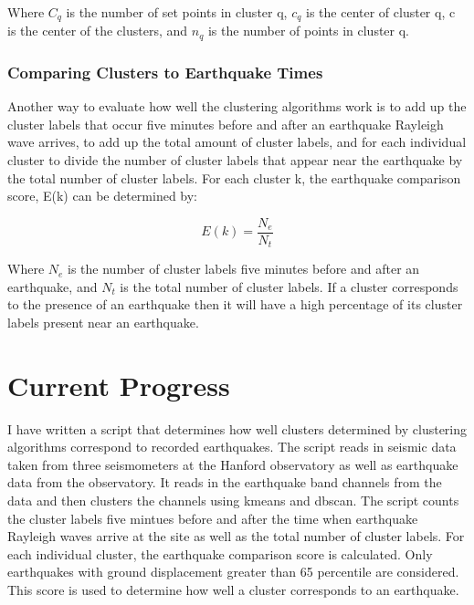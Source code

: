 \documentclass[colorlinks=true,pdfstartview=FitV,linkcolor=blue,
            citecolor=red,urlcolor=magenta]{ligodoc}
\begin{document}
\par Where \(C_q\) is the number of set points in cluster q, \(c_q\) is the center of cluster q, c is the center of the clusters, and \(n_q\) is the number of points in cluster q. \cite{Citation2} 

\subsubsection{Comparing Clusters to Earthquake Times}

\indent 

\par Another way to evaluate how well the clustering algorithms work is to add up the cluster labels that occur five  minutes before and after an earthquake Rayleigh wave arrives, to add up the total amount of cluster labels, and for each individual cluster to divide the number of cluster labels that appear near the earthquake by the total number of cluster labels. For each cluster k, the earthquake comparison score, E(k) can be determined by:

\[E(k) = \frac{N_e}{N_t}\]

Where \(N_e\) is the number of cluster labels five minutes before and after an earthquake, and \(N_t\) is the total number of cluster labels. If a cluster corresponds to the presence of an earthquake then it will have a high percentage of its cluster labels present near an earthquake.  

\section{Current Progress}

\indent 

\par I have written a script that determines how well clusters determined by clustering algorithms correspond to recorded earthquakes. The script reads in seismic data taken from three seismometers at the Hanford observatory as well as earthquake data from the observatory. It reads in the earthquake band channels from the data and then clusters the channels using kmeans and dbscan. The script counts the cluster labels five mintues before and after the time when earthquake Rayleigh waves arrive at the site as well as the total number of cluster labels. For each individual cluster, the earthquake comparison score is calculated. Only earthquakes with ground displacement greater than 65 percentile are considered. This score is used to determine how well a cluster corresponds to an earthquake. 
\end{document}
